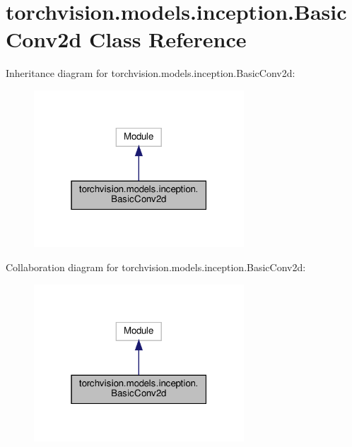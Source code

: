 \hypertarget{classtorchvision_1_1models_1_1inception_1_1BasicConv2d}{}\section{torchvision.\+models.\+inception.\+Basic\+Conv2d Class Reference}
\label{classtorchvision_1_1models_1_1inception_1_1BasicConv2d}


Inheritance diagram for torchvision.\+models.\+inception.\+Basic\+Conv2d\+:
\nopagebreak
\begin{figure}[H]
\begin{center}
\leavevmode
\includegraphics[width=223pt]{classtorchvision_1_1models_1_1inception_1_1BasicConv2d__inherit__graph}
\end{center}
\end{figure}


Collaboration diagram for torchvision.\+models.\+inception.\+Basic\+Conv2d\+:
\nopagebreak
\begin{figure}[H]
\begin{center}
\leavevmode
\includegraphics[width=223pt]{classtorchvision_1_1models_1_1inception_1_1BasicConv2d__coll__graph}
\end{center}
\end{figure}
